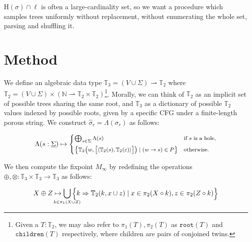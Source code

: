 \documentclass[sigplan,nonacm,anonymous]{acmart}\settopmatter{printfolios=false,printccs=false,printacmref=false}
\begin{document}
  $\text{H}(\sigma)\cap\ell$ is often a large-cardinality set, so we want a procedure which samples trees uniformly without replacement, without enumerating the whole set, parsing and shuffling it.

  \pagebreak\section{Method}\label{sec:method}

   We define an algebraic data type $\mathbb{T}_3 = (V \cup \Sigma) \rightharpoonup \mathbb{T}_2$ where $\mathbb{T}_2 = (V \cup \Sigma) \times (\mathbb{N} \rightharpoonup \mathbb{T}_2\times\mathbb{T}_2)$\footnote{Given a $T:\mathbb{T}_2$, we may also refer to $\pi_1(T), \pi_2(T)$ as $\texttt{root}(T)$ and $\texttt{children}(T)$ respectively, where children are pairs of conjoined twins.}. Morally, we can think of $\mathbb{T}_2$ as an implicit set of possible trees sharing the same root, and $\mathbb{T}_3$ as a dictionary of possible $\mathbb{T}_2$ values indexed by possible roots, given by a specific CFG under a finite-length porous string. We construct $\hat\sigma_r = \Lambda(\sigma_r)$ as follows:

\begin{equation*}
  \begin{footnotesize}
\Lambda(s: \underline\Sigma) \mapsto \begin{cases}
\bigoplus_{s\in \Sigma} \Lambda(s) & \text{if $s$ is a hole,} \vspace{5pt}\\
\big\{\mathbb{T}_2\big(w, \big[\langle\mathbb{T}_2(s), \mathbb{T}_2(\varepsilon)\rangle\big]\big) \mid (w \rightarrow s)\in P\big\} & \text{otherwise.}
\end{cases}
  \end{footnotesize}
\end{equation*}

\noindent We then compute the fixpoint $M_\infty$ by redefining the operations $\oplus, \otimes: \mathbb{T}_3 \times \mathbb{T}_3 \rightarrow \mathbb{T}_3$ as follows:

\begin{equation*}
  \begin{footnotesize}
  X \oplus Z \mapsto \bigcup_{\mathclap{k\in \pi_1(X \cup Z)}}\Big\{k \Rightarrow \mathbb{T}_2(k, x \cup z) \mid x \in \pi_2(X\circ k), z \in \pi_2(Z\circ k)\Big\}
  \end{footnotesize}
\end{equation*}
\end{document}
